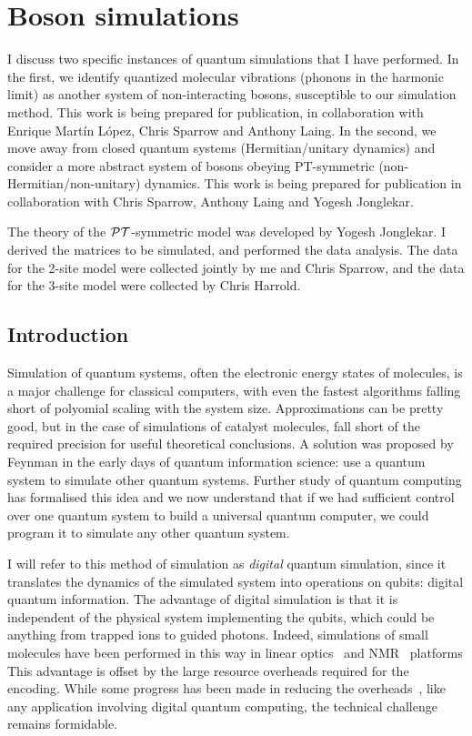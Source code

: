 \chapter{Boson simulations}
\label{ch:Simulations}
I discuss two specific instances of quantum simulations that I have
performed. In the first, we identify quantized molecular vibrations (phonons in
the harmonic limit) as another system of non-interacting bosons, susceptible to
our simulation method. This work is being prepared for publication, in
collaboration with Enrique Mart\'in L\'opez, Chris Sparrow and Anthony Laing.
In the second, we move away from closed quantum systems (Hermitian/unitary
dynamics) and consider a more abstract system of bosons obeying PT-symmetric
(non-Hermitian/non-unitary) dynamics. This work is being prepared for
publication in collaboration with Chris Sparrow, Anthony Laing and Yogesh
Jonglekar.

The theory of the 
\(\mathcal{PT}\)-symmetric model was developed by Yogesh Jonglekar. I derived the
matrices to be simulated, and performed the data analysis. The data for the
2-site model were collected jointly by me and Chris Sparrow, and the data for
the 3-site model were collected by Chris Harrold.

\section{Introduction}
\label{sec:SimIntro}
Simulation of quantum systems, often the electronic energy states of molecules,
is a major challenge for classical computers, with even the fastest algorithms
falling short of polyomial scaling with the system size. Approximations can be
pretty good, but in the case of simulations of catalyst molecules, fall short
of the required precision for useful theoretical conclusions.  A solution
was proposed by Feynman \cite{qsim-feynman} in the early days of quantum
information science: use a quantum system to simulate other quantum systems.
Further study of quantum computing has formalised this idea and we now
understand that if we had sufficient control over one quantum system to build a
universal quantum computer, we could program it to simulate any other quantum
system.

I will refer to this method of simulation as \emph{digital} quantum simulation,
since it translates the dynamics of the simulated system into operations on
qubits: digital quantum information. The advantage of digital simulation is that
it is independent of the physical system implementing the qubits, which could be
anything from trapped ions to guided photons. Indeed, simulations of small
molecules have been performed in this way in linear optics~\cite{qsim-peruzzo}
and NMR~\cite{qsim-du} platforms  This advantage is offset by
the large resource overheads required for the encoding. While some progress has
been made in reducing the overheads~\cite{qsim-poulin}, like any application
involving digital quantum computing, the technical challenge remains formidable.

